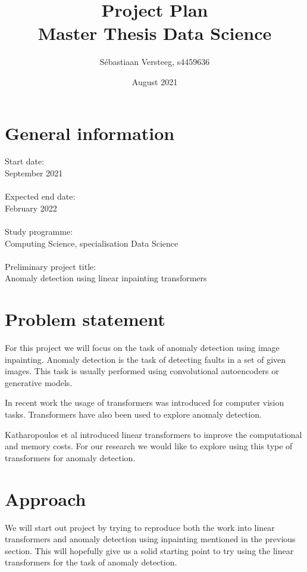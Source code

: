 \documentclass{article}
\title{Project Plan \\ \large{Master Thesis Data Science}}
\author{S\'ebastiaan Versteeg, s4459636}
\date{August 2021}
\begin{document}
\maketitle

\section{General information}

Start date:\\
September 2021\\
\\
Expected end date:\\
February 2022\\
\\
Study programme:\\
Computing Science, specialisation Data Science\\
\\
Preliminary project title:\\
Anomaly detection using linear inpainting transformers\\

\section{Problem statement}
\label{problem-statement}

For this project we will focus on the task of anomaly detection using image inpainting. Anomaly detection is the task of detecting faults in a set of given images. 
This task is usually performed using convolutional autoencoders\cite{Autoencoder-Detection:2021} or generative models\cite{GAN-Detection:2021}.

In recent work the usage of transformers was introduced for computer vision tasks\cite{VisualTransformers:2020}. Transformers have also been used to explore anomaly detection\cite{Inpainting:2021}.

Katharopoulos et al introduced linear transformers\cite{LinearTransformers:2020} to improve the computational and memory costs. For our research we would like to explore using this type of transformers for anomaly detection.

\section{Approach}

We will start out project by trying to reproduce both the work into linear transformers and anomaly detection using inpainting mentioned in the previous section.
This will hopefully give us a solid starting point to try using the linear transformers for the task of anomaly detection.
\end{document}
